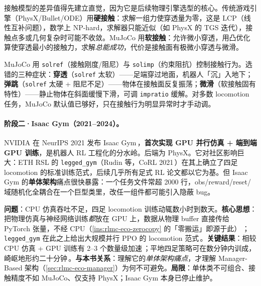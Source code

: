 接触模型的差异值得先建立直觉，因为它是后续物理引擎选型的核心。传统游戏引擎（PhysX/Bullet/ODE）用\textbf{硬接触}：求解一组力使穿透量为零，这是 LCP（线性互补问题），数学上 NP-hard，求解器只能近似（如 PhysX 的 TGS 迭代），接触点多或几何复杂时可能不收敛。MuJoCo 用\textbf{软接触}：允许微小穿透，用凸优化算使穿透最小的接触力，求解\emph{总能成功}，代价是接触面有极微小穿透与微滑。

\begin{pitfall}[接触参数选错的三种典型症状]
MuJoCo 用 \verb|solref|（接触刚度/阻尼）与 \verb|solimp|（约束阻抗）控制接触行为。选错的三种症状：\textbf{穿透}（\verb|solref| 太软）——足端穿过地面，机器人「沉」入地下；\textbf{弹跳}（\verb|solref| 太硬 + 阻尼不足）——物体在接触面反复振荡；\textbf{微滑}（软接触固有特性）——静止物体在斜面缓慢下滑，可调 \verb|impratio| 缓解。对多数 locomotion 任务，MuJoCo 默认值已够好，只在接触行为明显异常时才手动调。
\end{pitfall}

\paragraph{阶段二·Isaac Gym（2021--2024）。}NVIDIA 在 NeurIPS 2021 发布 Isaac Gym\,\cite{makoviychuk2021isaacgym}，\textbf{首次实现 GPU 并行仿真 + 端到端 GPU 训练}，是机器人 RL 工程化的分水岭。后端为 PhysX。它对社区影响巨大：ETH RSL 的 \verb|legged_gym|（Rudin 等，CoRL 2021\,\cite{rudin2021minutes}）在其上确立了四足 locomotion 的标准训练范式，后续几乎所有足式 RL 论文都以它为基。但 Isaac Gym 的\textbf{单体架构}痛点很快暴露：一个任务文件常超 2000 行，obs/reward/reset/域随机化全耦合在一个巨型类里，改任一组件都可能引入隐蔽 bug。

\begin{paper}\label{paper:rlmc-eco-isaacgym}
\textbf{问题}：CPU 仿真吞吐不足，四足 locomotion 训练动辄数小时到数天。\textbf{核心思想}：把物理仿真与神经网络训练\emph{都}放在 GPU 上，数据从物理 buffer 直接传给 PyTorch 张量，不经 CPU（\cref{ins:rlmc-eco-zerocopy} 的「零搬运」即源于此）\,\cite{makoviychuk2021isaacgym}；\verb|legged_gym| 在此之上给出大规模并行 PPO 的 locomotion 范式\,\cite{rudin2021minutes}。\textbf{关键结果}：相较 CPU 仿真 + GPU 训练有 2--3 个数量级加速\,\cite{makoviychuk2021isaacgym}；平地四足策略可在数分钟内训成，崎岖地形约二十分钟\,\cite{rudin2021minutes}。\textbf{与本书关系}：理解它的\emph{单体架构痛点}，才理解 Manager-Based 架构（\cref{sec:rlmc-eco-manager}）为何不可避免。\textbf{局限}：单体类不可组合、接触精度不如 MuJoCo、仅支持 PhysX；Isaac Gym 本身已停止维护。
\end{paper}

